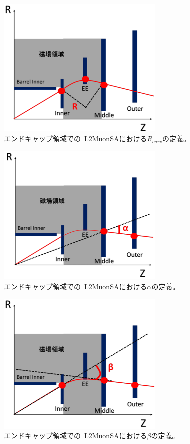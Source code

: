 \begin{figure}[h]
  \centering
  \includegraphics[clip, width=8cm]{fig/3/l2muonSA_Rcurv.png}
  \caption{エンドキャップ領域での~L2MuonSAにおける$R_{curv}$の定義\cite{article:noguchi}。}
  \label{fig:3-7}
\end{figure}

\begin{figure}[h]
  \centering
  \includegraphics[clip, width=8cm]{fig/3/l2muonSA_alpha.png}
  \caption{エンドキャップ領域での~L2MuonSAにおける$\alpha$の定義\cite{article:noguchi}。}
  \label{fig:3-8}
\end{figure}

\begin{figure}[h]
  \centering
  \includegraphics[clip, width=8cm]{fig/3/l2muonSA_beta.png}
  \caption{エンドキャップ領域での~L2MuonSAにおける$\beta$の定義\cite{article:noguchi}。}
  \label{fig:3-9}
\end{figure}



